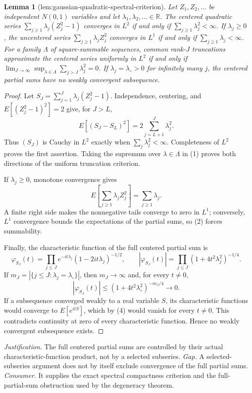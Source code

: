 \documentclass{article}
\newtheorem{lemma}{Lemma}
\begin{document}
\begin{lemma}[lem:gaussian-quadratic-spectral-criterion]\label{lem:gaussian-quadratic-spectral-criterion}
Let \(Z_1,Z_2,\ldots\) be independent \(N(0,1)\) variables and let \(\lambda_1,\lambda_2,\ldots\in\mathbb R\). The centered quadratic series \(\sum_{j\ge1}\lambda_j(Z_j^2-1)\) converges in \(L^2\) if and only if \(\sum_{j\ge1}\lambda_j^2<\infty\). If \(\lambda_j\ge0\), the uncentered series \(\sum_{j\ge1}\lambda_jZ_j^2\) converges in \(L^1\) if and only if \(\sum_{j\ge1}\lambda_j<\infty\). For a family \(\Lambda\) of square-summable sequences, common rank-\(J\) truncations approximate the centered series uniformly in \(L^2\) if and only if \(\lim_{J\to\infty}\sup_{\lambda\in\Lambda}\sum_{j>J}\lambda_j^2=0\). If \(\lambda_j=\lambda_\circ>0\) for infinitely many \(j\), the centered partial sums have no weakly convergent subsequence.
\end{lemma}
\begin{proof}
Let \(S_J=\sum_{j=1}^J\lambda_j(Z_j^2-1)\). Independence, centering, and \(E[(Z_j^2-1)^2]=2\) give, for \(J>L\),
\[E[(S_J-S_L)^2]=2\sum_{j=L+1}^J\lambda_j^2.\tag{1}\]
Thus \((S_J)\) is Cauchy in \(L^2\) exactly when \(\sum_j\lambda_j^2<\infty\). Completeness of \(L^2\) proves the first assertion. Taking the supremum over \(\lambda\in\Lambda\) in (1) proves both directions of the uniform truncation criterion.

If \(\lambda_j\ge0\), monotone convergence gives
\[E\!\left[\sum_{j\ge1}\lambda_jZ_j^2\right]=\sum_{j\ge1}\lambda_j.\tag{2}\]
A finite right side makes the nonnegative tails converge to zero in \(L^1\); conversely, \(L^1\) convergence bounds the expectations of the partial sums, so (2) forces summability.

Finally, the characteristic function of the full centered partial sum is
\[\varphi_{S_J}(t)=\prod_{j\le J}e^{-it\lambda_j}(1-2it\lambda_j)^{-1/2},\qquad |\varphi_{S_J}(t)|=\prod_{j\le J}(1+4t^2\lambda_j^2)^{-1/4}.\tag{3}\]
If \(m_J=|\{j\le J:\lambda_j=\lambda_\circ\}|\), then \(m_J\to\infty\) and, for every \(t\ne0\),
\[|\varphi_{S_J}(t)|\le(1+4t^2\lambda_\circ^2)^{-m_J/4}\longrightarrow0.\tag{4}\]
If a subsequence converged weakly to a real variable \(S\), its characteristic functions would converge to \(E[e^{itS}]\), which by (4) would vanish for every \(t\ne0\). This contradicts continuity at zero of every characteristic function. Hence no weakly convergent subsequence exists.
\end{proof}
\par\smallskip\noindent \textit{Justification.} The full centered partial sums are controlled by their actual characteristic-function product, not by a selected subseries. \textit{Gap.} A selected-subseries argument does not by itself exclude convergence of the full partial sums. \textit{Consumer.} It supplies the exact spectral compactness criterion and the full-partial-sum obstruction used by the degeneracy theorem.
\end{document}

